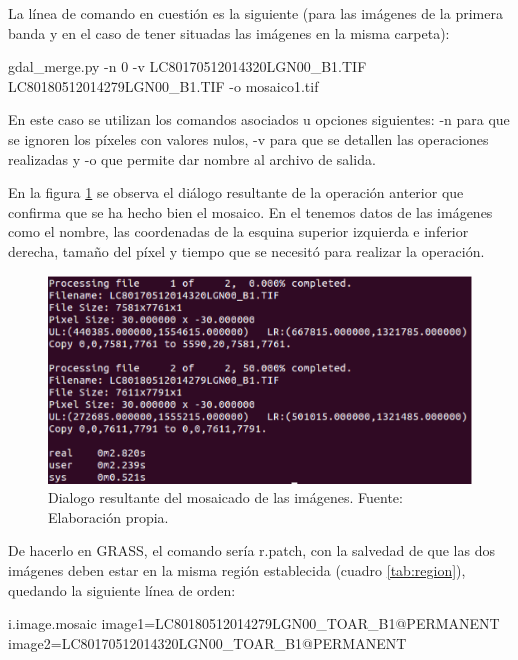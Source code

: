 La línea de comando en cuestión es la siguiente (para las imágenes de la primera banda y en el caso de tener situadas las imágenes en la misma carpeta):

\begin{center}
\begin{boxedverbatim}
	gdal_merge.py -n 0 -v LC80170512014320LGN00_B1.TIF 
	LC80180512014279LGN00_B1.TIF -o mosaico1.tif
\end{boxedverbatim}
\end{center}

En este caso se utilizan los comandos asociados u opciones siguientes: -n para que se ignoren los píxeles con valores nulos, -v para que se detallen las operaciones realizadas y -o que permite dar nombre al archivo de salida.\Sep

En la figura \ref{fig:dialogomosaico} se observa el diálogo resultante de la operación anterior que confirma que se ha hecho bien el mosaico. En el tenemos datos de las imágenes como el nombre, las coordenadas de la esquina superior izquierda e inferior derecha, tamaño del píxel y tiempo que se necesitó para realizar la operación.

\begin{figure}
	\centering
	\includegraphics[width=0.8\linewidth]{./Imagenes/Dialogo_mosaico.eps}
	\caption[Dialogo del mosaicado]{Dialogo resultante del mosaicado de las imágenes. Fuente: Elaboración propia.}
	\label{fig:dialogomosaico}
\end{figure}

De hacerlo en GRASS, el comando sería r.patch, con la salvedad de que las dos imágenes deben estar en la misma región establecida (cuadro \ref{tab:region}), quedando la siguiente línea de orden:

\begin{center}
\begin{boxedverbatim}
	i.image.mosaic image1=LC80180512014279LGN00_TOAR_B1@PERMANENT
	image2=LC80170512014320LGN00_TOAR_B1@PERMANENT
\end{boxedverbatim}
\end{center}

